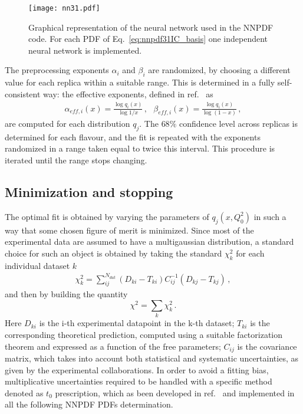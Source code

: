 \begin{figure}[htb]     
	\begin{center}
		\texttt{[image: nn31.pdf]}
	\end{center}
    \caption{Graphical representation of the neural network used in the NNPDF code.
    For each PDF of Eq.~\eqref{eq:nnpdf31IC_basis} one independent neural network is implemented.}
	\label{nn}                 
\end{figure}
The preprocessing exponents $\alpha_i$ and $\beta_i$ are randomized, by choosing a different value for each replica
within a suitable range. This is determined in a fully self-consistent way: the effective exponents, defined in
ref.~\cite{Ball:2014uwa} as 
\begin{align}
    \label{eq:effective_exp}
    \alpha_{eff,i}\left(x\right) = \frac{\log q_i\left(x\right)}{\log 1/x}\,, \,\,\,\,
    \beta_{eff,i}\left(x\right) = \frac{\log q_i\left(x\right)}{\log\left(1-x\right)}\,,
\end{align}
are computed for each distribution $q_j$. The $68\%$ confidence level across replicas
is determined for each flavour, and the fit is repeated with the exponents randomized in a range taken equal to twice this 
interval. This procedure is iterated until the range stops changing.

\subsection{Minimization and stopping}
\label{sec:minimization}
The optimal fit is obtained by varying the parameters of $q_j\left(x,Q_0^2\right)$  in such a way that 
some chosen figure of merit is minimized. 
Since most of the experimental data are assumed to have a multigaussian
distribution, a standard choice for such an object is obtained by taking the standard $\chi^2_k $ for each individual 
dataset $k$
\begin{align}
    \label{eq:chi2}
    \chi^2_k 
    =\sum_{ij}^{N_{dat}}\left(D_{ki}-T_{ki}\right)C_{ij}^{-1}\left(D_{kj}-T_{kj}\right)\,,
\end{align}
and then by building the quantity
\begin{equation}
\label{tot chi2}
\chi^2=\sum_k \chi^2_k\,.
\end{equation}
Here $D_{ki}$ is the i-th experimental datapoint in the k-th dataset; $T_{ki}$ is the corresponding 
theoretical prediction, computed using a suitable factorization theorem and 
expressed as a function of the free parameters; 
$C_{ij}$ is the covariance matrix, which takes into account both statistical and systematic uncertainties,
as given by the experimental collaborations.
In order to avoid a fitting bias, multiplicative uncertainties required to be handled with a specific method
denoted as $t_0$ prescription, which as been developed in ref.~\cite{Ball:2009qv} and implemented in all the following
NNPDF PDFs determination.

